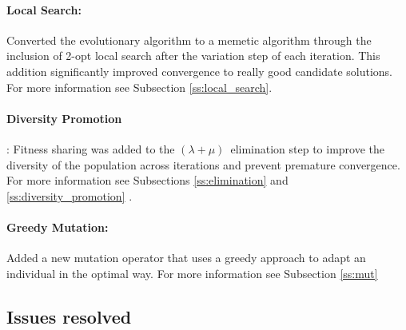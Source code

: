 \documentclass[a4paper,10pt]{article}
\newcommand{\ReplaceMe}[1]{{\color{blue}#1}}
\begin{document}
\paragraph{Local Search:} Converted the evolutionary algorithm to a memetic algorithm through the inclusion of 2-opt local search after the variation step of each iteration. This addition significantly improved convergence to really good candidate solutions. For more information see Subsection \ref{ss:local_search}.


\paragraph{Diversity Promotion}: Fitness sharing was added to the $(\lambda+\mu)$~elimination step to improve the diversity of the population across iterations and prevent premature convergence. For more information see Subsections \ref{ss:elimination} and \ref{ss:diversity_promotion} .

\paragraph{Greedy Mutation:} Added a new mutation operator that uses a greedy approach to adapt an individual in the optimal way. For more information see Subsection \ref{ss:mut}


\subsection{Issues resolved}

\end{document}
